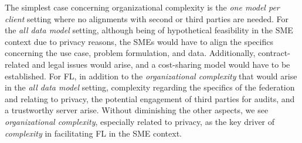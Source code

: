 The simplest case concerning organizational complexity is the \emph{one model per client} setting where no alignments with second or third parties are needed. For the \emph{all data model} setting, although being of hypothetical feasibility in the SME context due to privacy reasons, the SMEs would have to align the specifics concerning the use case, problem formulation, and data. Additionally, contract-related and legal issues would arise, and a cost-sharing model would have to be established.
For FL, in addition to the \emph{organizational complexity} that would arise in the \emph{all data model} setting, complexity regarding the specifics of the federation and relating to privacy, the potential engagement of third parties for audits, and a trustworthy server arise. Without diminishing the other aspects, we see \emph{organizational complexity}, especially related to privacy, as the key driver of \emph{complexity} in facilitating FL in the SME context.

